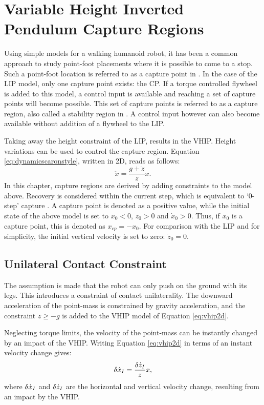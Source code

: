 %
\chapter{Variable Height Inverted Pendulum Capture Regions}\label{chap:regions}
Using simple models for a walking humanoid robot, it has been a common approach to study point-foot placements where it is possible to come to a stop. Such a point-foot location is referred to as a capture point in \cite{pratt2006capture}. In the case of the \ac{LIP} model, only one capture point exists: the \ac{CP}. If a torque controlled flywheel is added to this model, a control input is available and reaching a set of capture points will become possible. This set of capture points is referred to as a capture region, also called a stability region in \cite{stephens2007humanoid}. A control input however can also become available without addition of a flywheel to the \ac{LIP}.


Taking away the height constraint of the \ac{LIP}, results in the \ac{VHIP}. Height variations can be used to control the capture region. Equation \eqref{eq:dynamicscaronstyle}, written in \ac{2D}, reads as follows:
\begin{equation}
	\label{eq:vhip2d}
	\ddot{x}=\frac{g+\ddot{z}}{z}x.
\end{equation}	
In this chapter, capture regions are derived by adding constraints to the model above. Recovery is considered within the current step, which is equivalent to `0-step' capture \cite{koolen2012capturability}. A capture point is denoted as a positive value, while the initial state of the above model is set to $x_0<0$, $z_0>0$ and $\dot{x}_0>0$. Thus, if $x_0$ is a capture point, this is denoted as $x_{cp}=-x_0$. For comparison with the \ac{LIP} and for simplicity, the initial vertical velocity is set to zero: $\dot{z}_0=0$.



\section{Unilateral Contact Constraint}
The assumption is made that the robot can only push on the ground with its legs. This introduces a constraint of contact unilaterality. The downward acceleration of the point-mass is constrained by gravity acceleration, and the constraint $\ddot{z} \geq -g$ is added to the \ac{VHIP} model of Equation \eqref{eq:vhip2d}.

Neglecting torque limits, the velocity of the point-mass can be instantly changed by an impact of the \ac{VHIP}. Writing Equation \eqref{eq:vhip2d} in terms of an instant velocity change gives:
\begin{equation}
	\label{eq:vhipi}
	\delta \dot{x}_I=\frac{\delta \dot{z}_I}{z}x,
\end{equation}	
where $\delta \dot{x}_I$ and $\delta \dot{z}_I$ are the horizontal and vertical velocity change, resulting from an impact by the \ac{VHIP}.


